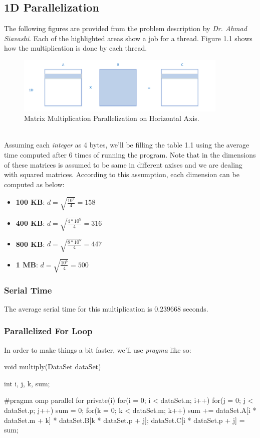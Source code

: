\documentclass[12pt]{article}
\numberwithin{equation}{section}
\numberwithin{table}{section}
\numberwithin{figure}{section}
\begin{document}
\subsection{1D Parallelization}
The following figures are provided from the problem description by \textit{Dr. Ahmad Siavashi}. Each of the highlighted areas show a job for a thread. Figure 1.1 shows how the multiplication is done by each thread.
\begin{figure}[!h]\centering
	\includegraphics[width=0.9\textwidth]{one_dimensional.png}
	\caption{Matrix Multiplication Parallelization on Horizontal Axis.}
	\label{figsolplot}
\end{figure}\\
Assuming each \textit{integer} as 4 bytes, we'll be filling the table 1.1 using the average time computed after 6 times of running the program. Note that in the dimensions of these matrices is assumed to be same in different axises and we are dealing with squared matrices. According to this assumption, each dimension can be computed as below:
\begin{itemize}
	\item \textbf{100 KB}:  $d = \sqrt{\frac{10^5}{4}} = 158$
	\item \textbf{400 KB}:  $d = \sqrt{\frac{4 * 10^5}{4}} = 316$
	\item \textbf{800 KB}:  $d = \sqrt{\frac{8 * 10^5}{4}} = 447$
	\item \textbf{1 MB}:  $d = \sqrt{\frac{10^{6}}{4}} = 500$
\end{itemize}
\subsubsection{Serial Time}
The average serial time for this multiplication is $0.239668$ seconds.
\subsubsection{Parallelized For Loop}
In order to make things a bit faster, we'll use \textit{pragma} like so:
\begin{cpp}
		void multiply(DataSet dataSet){
			int i, j, k, sum;
			
			#pragma omp parallel for private(i)
			for(i = 0; i < dataSet.n; i++){
				for(j = 0; j < dataSet.p; j++){
					sum = 0;
					for(k = 0; k < dataSet.m; k++){
						sum += dataSet.A[i * dataSet.m + k] * dataSet.B[k * dataSet.p + j];
					}
					dataSet.C[i * dataSet.p + j] = sum;
				}
			}
		}
\end{cpp}
\end{document}
